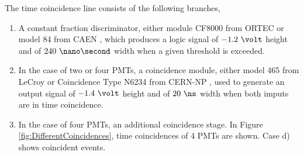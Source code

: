 The time coincidence line consists of the following branches,

\begin{enumerate}

\item{}  A constant fraction discriminator, either module CF8000 from ORTEC \cite{DataSheetDiscriminator} or model 84 from CAEN \cite{DataSheetDiscriminatorCAEN}, which produces a logic signal of $-1.2~\volt$ height and of $240~\nano\second$ width when a given threshold is exceeded.

\item{} In the case of two or four PMTs, a coincidence module, either model 465 from LeCroy \cite{DataSheetCoincidenceLeCroy} or Coincidence Type N6234 from CERN-NP \cite{DataSheetCoincidenceCERN}, used to generate an output signal of $-1.4~\volt$ height and of $20~\ns$ width when both imputs are in time coincidence. 

\item{} In the case of four PMTs, an additional coincidence stage. In Figure \ref{fig:DifferentCoincidences}, time coincidences of 4 PMTs are shown. Case d) shows coincident events.






\end{enumerate}
